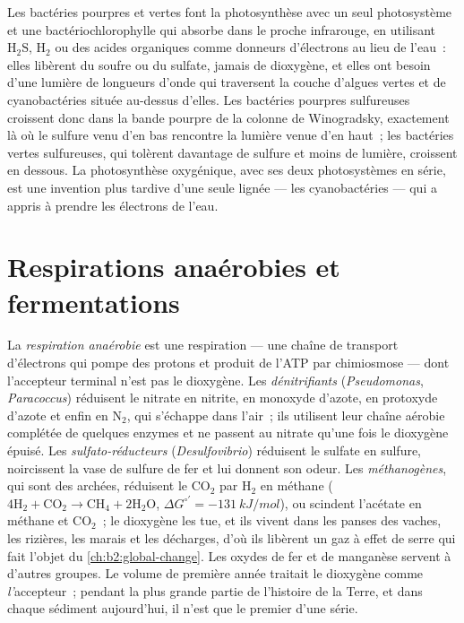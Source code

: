 \begin{definition}\label{def:b2:microbial-metabolism:anoxygenic}
Les bactéries pourpres et vertes font la photosynthèse avec un seul
photosystème et une bactériochlorophylle qui absorbe dans le proche
infrarouge, en utilisant $\mathrm{H_2S}$, $\mathrm{H_2}$ ou des acides
organiques comme donneurs d'électrons au lieu de l'eau~: elles libèrent
du soufre ou du sulfate, jamais de dioxygène, et elles ont besoin d'une
lumière de longueurs d'onde qui traversent la couche d'algues vertes et
de cyanobactéries située au-dessus d'elles. Les bactéries pourpres
sulfureuses croissent donc dans la bande pourpre de la colonne de
Winogradsky, exactement là où le sulfure venu d'en bas rencontre la
lumière venue d'en haut~; les bactéries vertes sulfureuses, qui tolèrent
davantage de sulfure et moins de lumière, croissent en dessous. La
photosynthèse oxygénique, avec ses deux photosystèmes en série, est une
invention plus tardive d'une seule lignée --- les cyanobactéries
--- qui a appris à prendre les électrons de l'eau.
\end{definition}

\section{Respirations anaérobies et fermentations}

\begin{definition}\label{def:b2:microbial-metabolism:anaerobic}
La \emph{respiration anaérobie} est une respiration --- une chaîne de
transport d'électrons qui pompe des protons et produit de l'ATP par
chimiosmose --- dont l'accepteur terminal n'est pas le dioxygène. Les
\emph{dénitrifiants} (\emph{Pseudomonas}, \emph{Paracoccus}) réduisent
le nitrate en nitrite, en monoxyde d'azote, en protoxyde d'azote et
enfin en $\mathrm{N_2}$, qui s'échappe dans l'air~; ils utilisent leur
chaîne aérobie complétée de quelques enzymes et ne passent au nitrate
qu'une fois le dioxygène épuisé. Les \emph{sulfato-réducteurs}
(\emph{Desulfovibrio}) réduisent le sulfate en sulfure, noircissent la
vase de sulfure de fer et lui donnent son odeur. Les
\emph{méthanogènes}, qui sont des archées, réduisent le $\mathrm{CO_2}$
par $\mathrm{H_2}$ en méthane ($4\mathrm{H_2} + \mathrm{CO_2} \to \mathrm{CH_4} +
2\mathrm{H_2O}$, $\Delta G^{\circ\prime} = \qty{-131}{kJ/mol}$), ou
scindent l'acétate en méthane et $\mathrm{CO_2}$~; le dioxygène les tue,
et ils vivent dans les panses des vaches, les rizières, les marais et
les décharges, d'où ils libèrent un gaz à effet de serre qui fait
l'objet du \cref{ch:b2:global-change}. Les oxydes de fer et de
manganèse servent à d'autres groupes. Le volume de première année
traitait le dioxygène comme \emph{l'}accepteur~; pendant la plus grande
partie de l'histoire de la Terre, et dans chaque sédiment aujourd'hui,
il n'est que le premier d'une série.
\end{definition}

